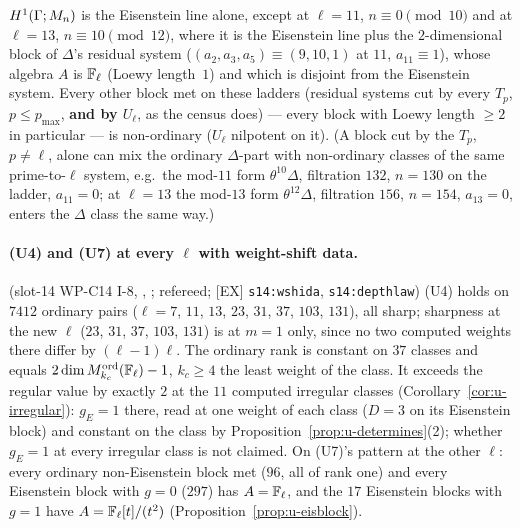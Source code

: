 \documentclass[11pt]{article}
\begin{document}
\begin{enumerate}[label=(U\arabic*)]
  $H^{1}(\Gamma;M_n)$ is the Eisenstein line alone, except at $\ell=11$, $n\equiv0\pmod{10}$ and at $\ell=13$, $n\equiv10\pmod{12}$, where it is the Eisenstein
  line plus the $2$-dimensional block of $\Delta$'s residual system ($(a_2,a_3,a_5)\equiv(9,10,1)$ at $11$, $a_{11}\equiv1$), whose algebra $A$ is $\mathbb{F}_\ell$
  (Loewy length~$1$) and which is disjoint from the Eisenstein system. Every other block met on these ladders (residual systems cut by every $T_p$, $p\le p_{\max}$,
  \textbf{and by $U_\ell$}, as the census does) --- every block with Loewy length $\ge2$ in particular --- is non-ordinary ($U_\ell$ nilpotent on it). (A block cut by
  the $T_p$, $p\ne\ell$, alone can mix the ordinary $\Delta$-part with non-ordinary classes of the same prime-to-$\ell$ system, e.g.\ the mod-$11$ form
  $\theta^{10}\Delta$, filtration $132$, $n=130$ on the ladder, $a_{11}=0$; at $\ell=13$ the mod-$13$ form $\theta^{12}\Delta$, filtration $156$,
  $n=154$, $a_{13}=0$, enters the $\Delta$ class the same way.)
\end{enumerate}
\paragraph{(U4) and (U7) at every $\ell$ with weight-shift data.} \COMP{} (slot-14 WP-C14 I-8,
, ; refereed; [EX] \texttt{s14:wshida}, \texttt{s14:depthlaw}) (U4) holds on
$7412$ ordinary pairs ($\ell=7$, $11$, $13$, $23$, $31$, $37$, $103$, $131$), all sharp; sharpness at the new $\ell$ ($23$, $31$, $37$, $103$, $131$) is at $m=1$
only, since no two computed weights there differ by $(\ell-1)\ell$. The ordinary rank is constant on $37$ classes and equals
$2\dim M^{\mathrm{ord}}_{k_c}(\mathbb{F}_\ell)-1$, $k_c\ge4$ the least weight of the class. It exceeds the regular value by exactly $2$ at the $11$ computed irregular
classes (Corollary~\ref{cor:u-irregular}): $g_E=1$ there, read at one weight of each class ($D=3$ on its Eisenstein block) and constant on the class by
Proposition~\ref{prop:u-determines}(2); whether $g_E=1$ at every irregular class is not claimed. On (U7)'s pattern at the other $\ell$: every ordinary
non-Eisenstein block met ($96$, all of rank one) and every Eisenstein block with $g=0$ ($297$) has $A=\mathbb{F}_\ell$, and the $17$ Eisenstein blocks with $g=1$ have $A=\mathbb{F}_\ell[t]/(t^{2})$ (Proposition~\ref{prop:u-eisblock}).
\end{document}
